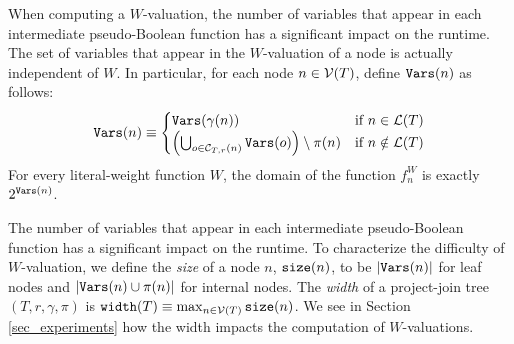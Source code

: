 When computing a $W$-valuation, the number of variables that appear in each intermediate pseudo-Boolean function has a significant impact on the runtime.
The set of variables that appear in the $W$-valuation of a node is actually independent of $W$.
In particular, for each node $n \in \mathcal{V}(T)$, define $\texttt{\upshape Vars}(n)$ as follows:
\begin{equation}
    \texttt{\upshape Vars}(n) \equiv
    \begin{cases}
        \texttt{\upshape Vars}(\gamma(n)) & \text{if}~n \in \mathcal{L}(T) \\
        \left( \bigcup_{o \in \mathcal{C}_{T,r}(n)} \texttt{\upshape Vars}(o) \right) \setminus \pi(n) & \text{if}~n \notin \mathcal{L}(T)
    \end{cases}
\end{equation}
For every literal-weight function $W$, the domain of the function $f^W_n$ is exactly $2^{\texttt{\upshape Vars}(n)}$.

The number of variables that appear in each intermediate pseudo-Boolean function has a significant impact on the runtime.
To characterize the difficulty of $W$-valuation, we define the \emph{size} of a node $n$, $\texttt{\upshape size}(n)$, to be $\left| \texttt{\upshape Vars}(n) \right|$ for leaf nodes and $\left| \texttt{\upshape Vars}(n) \cup \pi(n) \right|$ for internal nodes.
The \emph{width} of a project-join tree $(T, r, \gamma, \pi)$ is $\texttt{\upshape width}(T) \equiv \max_{n \in \mathcal{V}(T)} \texttt{\upshape size}(n)$.
We see in Section \ref{sec_experiments} how the width impacts the computation of $W$-valuations.






